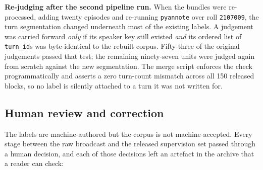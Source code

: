 \documentclass[11pt,a4paper]{article}
\begin{document}
\textbf{Re-judging after the second pipeline run.} When the bundles were re-processed, adding
twenty episodes and re-running \texttt{pyannote} over roll \texttt{2107009}, the turn
segmentation changed underneath most of the existing labels. A judgement was carried forward
\emph{only} if its speaker key still existed \emph{and} its ordered list of \texttt{turn\_id}s was
byte-identical to the rebuilt corpus. Fifty-three of the original judgements passed that test;
the remaining ninety-seven units were judged again from scratch against the new segmentation.
The merge script enforces the check programmatically and asserts a zero turn-count mismatch
across all 150 released blocks, so no label is silently attached to a turn it was not written
for.

\subsection{Human review and correction}

The labels are machine-authored but the corpus is not machine-accepted. Every stage between the
raw broadcast and the released supervision set passed through a human decision, and each of those
decisions left an artefact in the archive that a reader can check:
\end{document}
